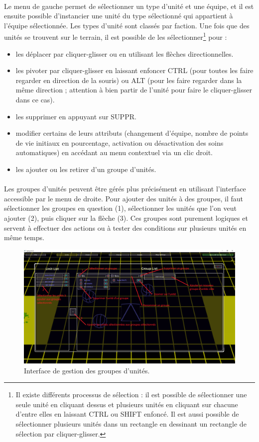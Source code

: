 \documentclass[a4paper]{article}
\begin{document}
\paragraph{ }
Le menu de gauche permet de sélectionner un type d'unité et une équipe, et il est ensuite possible d'instancier une unité du type sélectionné qui appartient à l'équipe sélectionnée. Les types d'unité sont classés par faction. Une fois que des unités se trouvent sur le terrain, il est possible de les sélectionner\footnote{Il existe différents processus de sélection : il est possible de sélectionner une seule unité en cliquant dessus et plusieurs unités en cliquant sur chacune d'entre elles en laissant CTRL ou SHIFT enfoncé. Il est aussi possible de sélectionner plusieurs unités dans un rectangle en dessinant un rectangle de sélection par cliquer-glisser.} pour :
\begin{itemize}
\item les déplacer par cliquer-glisser ou en utilisant les flèches directionnelles.
\item les pivoter par cliquer-glisser en laissant enfoncer CTRL (pour toutes les faire regarder en direction de la souris) ou ALT (pour les faire regarder dans la même direction ; attention à bien partir de l'unité pour faire le cliquer-glisser dans ce cas). 
\item les supprimer en appuyant sur SUPPR.
\item modifier certains de leurs attributs (changement d'équipe, nombre de points de vie initiaux en pourcentage, activation ou désactivation des soins automatiques) en accédant au menu contextuel via un clic droit.
\item les ajouter ou les retirer d'un groupe d'unités.
\end{itemize}
\paragraph{ }
Les groupes d'unités peuvent être gérés plus précisément en utilisant l'interface accessible par le menu de droite. Pour ajouter des unités à des groupes, il faut sélectionner les groupes en question (1), sélectionner les unités que l'on veut ajouter (2), puis cliquer sur la flèche (3). Ces groupes sont purement logiques et servent à effectuer des actions ou à tester des conditions sur plusieurs unités en même temps.
\begin{figure}[H]
\centering
\includegraphics[width=\linewidth]{editor-groups.png}
\caption{Interface de gestion des groupes d'unités.}
\label{fig:editor-groups}
\end{figure}
\end{document}

